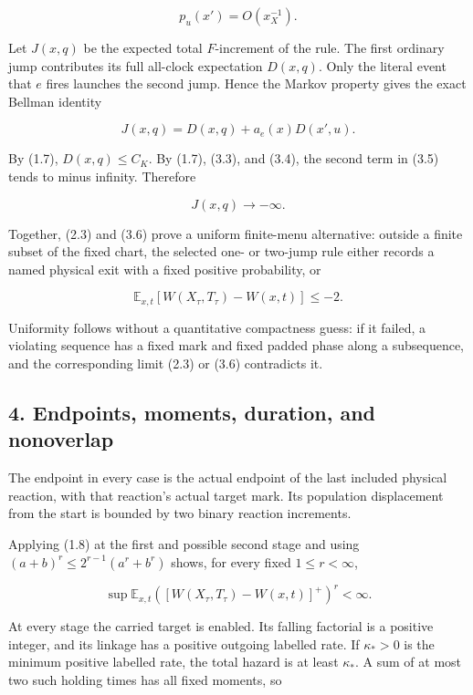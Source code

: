 \[
                         p_u(x')=O(x_X^{-1}).              \tag{3.4}
\]

Let \(J(x,q)\) be the expected total \(F\)-increment of the rule. The
first ordinary jump contributes its full all-clock expectation
\(D(x,q)\). Only the literal event that \(e\) fires launches the second
jump. Hence the Markov property gives the exact Bellman identity

\[
                    J(x,q)=D(x,q)+a_e(x)D(x',u).           \tag{3.5}
\]

By (1.7), \(D(x,q)\le C_K\). By (1.7), (3.3), and (3.4), the second term
in (3.5) tends to minus infinity. Therefore

\[
                              J(x,q)\longrightarrow-\infty. \tag{3.6}
\]

Together, (2.3) and (3.6) prove a uniform finite-menu alternative:
outside a finite subset of the fixed chart, the selected one- or
two-jump rule either records a named physical exit with a fixed positive
probability, or

\[
                 \mathbb E_{x,t}[W(X_\tau,T_\tau)-W(x,t)]
                              \le-2.                       \tag{3.7}
\]

Uniformity follows without a quantitative compactness guess: if it
failed, a violating sequence has a fixed mark and fixed padded phase
along a subsequence, and the corresponding limit (2.3) or (3.6)
contradicts it.

\subsection{4. Endpoints, moments, duration, and
nonoverlap}

The endpoint in every case is the actual endpoint of the last included
physical reaction, with that reaction's actual target mark. Its
population displacement from the start is bounded by two binary reaction
increments.

Applying (1.8) at the first and possible second stage and using
\((a+b)^r\le 2^{r-1}(a^r+b^r)\) shows, for every fixed
\(1\le r<\infty\),

\[
       \sup\mathbb E_{x,t}
       \left([W(X_\tau,T_\tau)-W(x,t)]^+\right)^r<\infty.  \tag{4.1}
\]

At every stage the carried target is enabled. Its falling factorial is a
positive integer, and its linkage has a positive outgoing labelled rate.
If \(\kappa_*>0\) is the minimum positive labelled rate, the total
hazard is at least \(\kappa_*\). A sum of at most two such holding times
has all fixed moments, so

